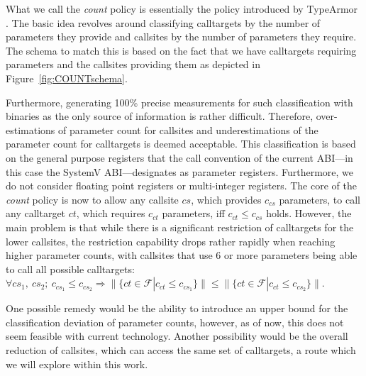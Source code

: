 What we call the \emph{count} policy is essentially the policy introduced by TypeArmor \cite{veen:typearmor}. 
The basic idea revolves around classifying calltargets by the number of parameters they provide and callsites 
by the number of parameters they require. The schema to match this is based on the fact that we  
have calltargets requiring parameters and the callsites providing them as depicted in Figure~\ref{fig:COUNTschema}.

Furthermore, generating 100\% precise measurements for such classification with binaries as the only source of information is rather difficult. 
Therefore, over-estimations of parameter count for callsites and underestimations of the parameter count for calltargets is deemed acceptable. 
This classification is based on the general purpose registers that the call convention of the current ABI---in this case the 
SystemV ABI---designates as parameter registers. Furthermore, we do not consider floating point registers or multi-integer registers. 
The core of the \emph{count} policy is now to allow any callsite $cs$, which provides $c_{cs}$ parameters, to call any calltarget $ct$, 
which requires $c_{ct}$ parameters, iff $c_{ct} \leq c_{cs}$ holds. However, the main problem is that while there is a significant 
restriction of calltargets for the lower callsites, the restriction capability drops rather rapidly when reaching higher parameter 
counts, with callsites that use 6 or more parameters being able to call all possible calltargets:
$\forall cs_1, \ cs_2; \ c_{cs_1} \leq c_{cs_2} \Longrightarrow  \| \{ct \in \mathcal{F} | c_{ct} \leq c_{cs_1} \} \| \leq \| \{ct \in \mathcal{F} | c_{ct} \leq c_{cs_2}  \} \|$.

One possible remedy would be the ability to introduce an upper bound for the classification deviation of parameter counts, 
however, as of now, this does not seem feasible with current technology. Another possibility would be the overall reduction
of callsites, which can access the same set of calltargets, a route which we will explore within this work.

